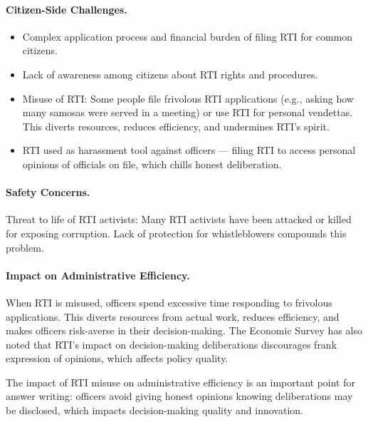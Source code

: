 \paragraph{Citizen-Side Challenges.}
\begin{itemize}
\item Complex application process and financial burden of filing RTI for common citizens.
\item Lack of awareness among citizens about RTI rights and procedures.
\item Misuse of RTI: Some people file frivolous RTI applications (e.g., asking how many samosas were served in a meeting) or use RTI for personal vendettas. This diverts resources, reduces efficiency, and undermines RTI's spirit.
\item RTI used as harassment tool against officers --- filing RTI to access personal opinions of officials on file, which chills honest deliberation.
\end{itemize}

\paragraph{Safety Concerns.} Threat to life of RTI activists: Many RTI activists have been attacked or killed for exposing corruption. Lack of protection for whistleblowers compounds this problem.

\paragraph{Impact on Administrative Efficiency.} When RTI is misused, officers spend excessive time responding to frivolous applications. This diverts resources from actual work, reduces efficiency, and makes officers risk-averse in their decision-making. The Economic Survey has also noted that RTI's impact on decision-making deliberations discourages frank expression of opinions, which affects policy quality.

\begin{CriticalPoint}
The impact of RTI misuse on administrative efficiency is an important point for answer writing: officers avoid giving honest opinions knowing deliberations may be disclosed, which impacts decision-making quality and innovation.
\end{CriticalPoint}

